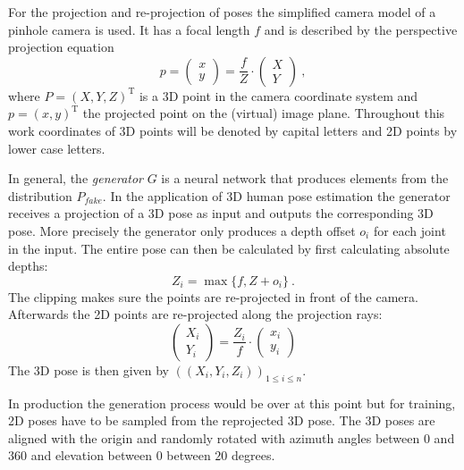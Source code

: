 For the projection and re-projection of poses the simplified camera model of a pinhole camera is used.
It has a focal length $f$ and is described by the perspective projection equation
\begin{equation}
	\label{eq:perspective-projection}
	p = 
	\begin{pmatrix}
	x\\
	y
	\end{pmatrix}
	= \frac{f}{Z} \cdot 	
	\begin{pmatrix}
	X\\
	Y
	\end{pmatrix} \ ,
\end{equation}
where $P = (X, Y, Z)^\mathrm{T}$ is a 3D point in the camera coordinate system and $p = (x, y)^\mathrm{T}$ the projected point on the (virtual) image plane.
Throughout this work coordinates of 3D points will be denoted by capital letters and 2D points by lower case letters.

In general, the \textit{generator} $G$ is a neural network that produces  elements from the distribution $P_{fake}$.
In the application of 3D human pose estimation the generator receives a projection of a 3D pose as input and outputs the corresponding 3D pose.
More precisely the generator only produces a depth offset $o_i$ for each joint in the input.
The entire pose can then be calculated by first calculating absolute depths:
\begin{equation}
	Z_i = \max \{f, Z + o_i\} \ .
\end{equation}
The clipping makes sure the points are re-projected in front of the camera.
Afterwards the 2D points are re-projected along the projection rays:
\begin{equation}
	\label{eq:perspective-re-projection}
	\begin{pmatrix}
	X_i\\
	Y_i
	\end{pmatrix} = \frac{Z_i}{f} \cdot
	\begin{pmatrix}
	x_i\\
	y_i
	\end{pmatrix}
\end{equation} 
The 3D pose is then given by $\left(\left(X_i, Y_i, Z_i\right)\right)_{1\leq i \leq n}$.

In production the generation process would be over at this point but for training, 2D poses have to be sampled from the reprojected 3D pose.
The 3D poses are aligned with the origin and randomly rotated with azimuth angles between $0$ and $360$ and elevation between $0$ between $20$ degrees.

